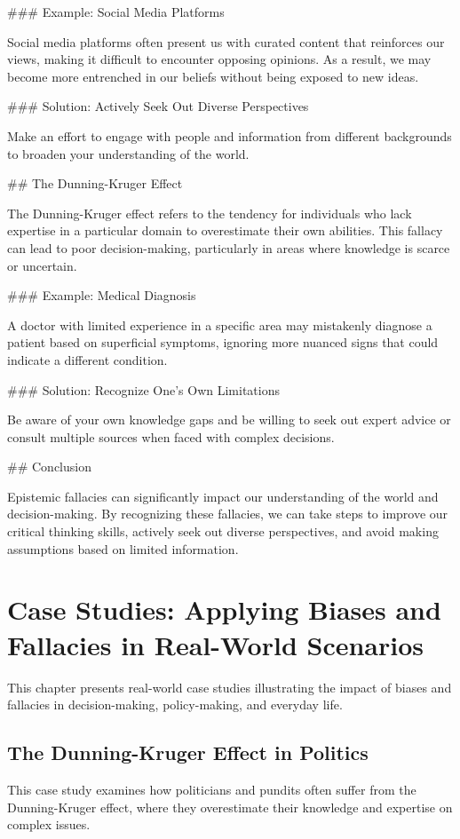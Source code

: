 \documentclass{report}%
\begin{document}
{{{### Example: Social Media Platforms

Social media platforms often present us with curated content that reinforces our views, making it difficult to encounter opposing opinions. As a result, we may become more entrenched in our beliefs without being exposed to new ideas.

### Solution: Actively Seek Out Diverse Perspectives

Make an effort to engage with people and information from different backgrounds to broaden your understanding of the world.

## The Dunning-Kruger Effect

The Dunning-Kruger effect refers to the tendency for individuals who lack expertise in a particular domain to overestimate their own abilities. This fallacy can lead to poor decision-making, particularly in areas where knowledge is scarce or uncertain.

### Example: Medical Diagnosis

A doctor with limited experience in a specific area may mistakenly diagnose a patient based on superficial symptoms, ignoring more nuanced signs that could indicate a different condition.

### Solution: Recognize One's Own Limitations

Be aware of your own knowledge gaps and be willing to seek out expert advice or consult multiple sources when faced with complex decisions.

## Conclusion

Epistemic fallacies can significantly impact our understanding of the world and decision-making. By recognizing these fallacies, we can take steps to improve our critical thinking skills, actively seek out diverse perspectives, and avoid making assumptions based on limited information.%
\chapter{Case Studies: Applying Biases and Fallacies in Real{-}World Scenarios}%
This chapter presents real-world case studies illustrating the impact of biases and fallacies in decision-making, policy-making, and everyday life.

%
\section{The Dunning{-}Kruger Effect in Politics}%
This case study examines how politicians and pundits often suffer from the Dunning-Kruger effect, where they overestimate their knowledge and expertise on complex issues.

}}}
\end{document}
